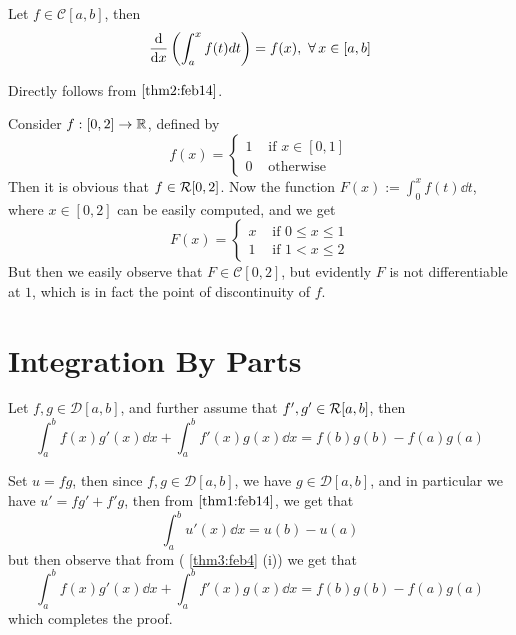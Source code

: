 \begin{corr}\label{cor1:feb14}
    Let $f \in \mathcal{C}[a,b]$, then 
    \[
        \dv{x} \left( \int_a^x f(t)dt \right) = f(x), \ \forall \, x \in [a,b]    
    \]
\end{corr}
\begin{prf}
    Directly follows from  $\ref{thm2:feb14}$.
\end{prf}

\begin{example}\label{eg3:feb14}
    Consider $f : [0,2] \to \mathbb{R}$, defined by 
    \[
        f(x) = \begin{cases}
            1 & \mbox{ if } x \in [0,1] \\ 
            0 & \mbox{ otherwise}
        \end{cases}  
    \]
    Then it is obvious that $f \in \mathcal{R}[0,2]$. Now the function $F(x) := \int_0^x f(t) \dd{t}$, where $x \in [0,2]$ can be easily computed, and we get 
    \[
        F(x) = \begin{cases}
            x & \mbox{ if } 0 \leq x \leq 1 \\ 
            1 & \mbox{ if } 1 < x \leq 2
        \end{cases}  
    \]
    But then we easily observe that $F \in \mathcal{C}[0,2]$, but evidently $F$ is not differentiable at $1$, which is in fact the point of discontinuity of $f$.
\end{example}

\section{Integration By Parts}

\begin{thm}\label{thm3:feb14} 
    Let $f, g \in \mathcal{D}[a,b]$, and further assume that $f', g' \in \mathcal{R}[a,b]$, then 
    \begin{equation}\label{ibp}
        \int_a^b f(x)g'(x) \dd{x} + \int_a^b f'(x)g(x) \dd{x} = f(b)g(b) - f(a)g(a)
    \end{equation}
\end{thm}

\begin{prf}
    Set $u = fg$, then since $f,g \in \mathcal{D}[a,b]$, we have $g \in \mathcal{D}[a,b]$, and in particular we have $u' = fg'+f'g$, then from  $\ref{thm1:feb14}$, we get that 
    \[
         \int_a^b u'(x) \dd{x} = u(b) - u(a)   
    \]
    but then observe that from  ( \ref{thm3:feb4} (i)) we get that 
    \[
        \int_a^b f(x)g'(x) \dd{x} + \int_a^b f'(x)g(x) \dd{x} = f(b)g(b) - f(a)g(a)  
    \]
    which completes the proof.
\end{prf}

